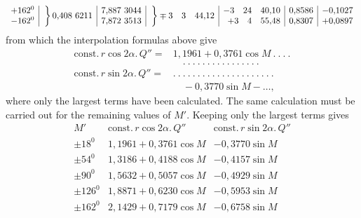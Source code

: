 \[\begin{array}{r|c|r|c|r|r|r}
\begin{array}{@{}r@{}}+162^{0}\\-162^{0}\end{array}&\left.\vphantom{\begin{array}{c}0\\0\end{array}}\right\}0{,}408\ 6211&\begin{array}{@{}r@{}}7{,}887\ 3044\\7{,}872\ 3513\end{array}&\left.\vphantom{\begin{array}{c}0\\0\end{array}}\right\}\mp3\quad3\quad44{,}12&\begin{array}{@{}r@{}}-3\quad24\quad40{,}10\\+3\quad4\quad55{,}48\end{array}&\begin{array}{@{}r@{}}0{,}8586\\0{,}8307\end{array}&\begin{array}{@{}r@{}}-0{,}1027\\+0{,}0897\end{array}
\end{array}
\]
\endgroup
from which the interpolation formulas above give
\[
\begin{aligned}
\mathrm{const.}\,r\cos2\alpha.\,Q''={}&1{,}1961+0{,}3761\cos M\ .\ .\ .\ .\\
&\quad .\ .\ .\ .\ .\ .\ .\ .\ .\ .\ .\ .\ .\ .\ .\ .\\
\mathrm{const.}\,r\sin2\alpha.\,Q''={}&.\ .\ .\ .\ .\ .\ .\ .\ .\ .\ .\ .\ .\ .\ .\ .\ .\ .\ .\ .\ .\\
&\quad-0{,}3770\sin M-\ldots,
\end{aligned}
\]
where only the largest terms have been calculated. The same calculation must be carried out for the remaining values of \(M'\). Keeping only the largest terms gives
\[
\begin{array}{r|l|l}
M'&\mathrm{const.}\,r\cos2\alpha.\,Q''&\mathrm{const.}\,r\sin2\alpha.\,Q''\\\hline
\pm18^{0}&1{,}1961+0{,}3761\cos M&-0{,}3770\sin M\\
\pm54^{0}&1{,}3186+0{,}4188\cos M&-0{,}4157\sin M\\
\pm90^{0}&1{,}5632+0{,}5057\cos M&-0{,}4929\sin M\\
\pm126^{0}&1{,}8871+0{,}6230\cos M&-0{,}5953\sin M\\
\pm162^{0}&2{,}1429+0{,}7179\cos M&-0{,}6758\sin M
\end{array}
\]
